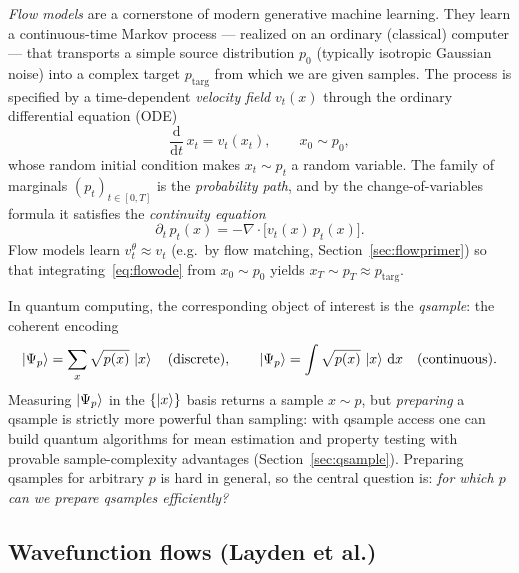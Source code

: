 \documentclass[11pt, a4paper]{article}
\begin{document}
\emph{Flow models} are a cornerstone of modern generative machine learning.
They learn a continuous-time Markov process --- realized on an ordinary
(classical) computer --- that transports a simple source distribution $p_0$
(typically isotropic Gaussian noise) into a complex target $p_{\mathrm{targ}}$
from which we are given samples. The process is specified by a time-dependent
\emph{velocity field} $v_t(x)$ through the ordinary differential equation (ODE)
\begin{equation}
  \frac{\mathrm{d}}{\mathrm{d}t}\,x_t=v_t(x_t),\qquad x_0\sim p_0,
  \label{eq:flowode}
\end{equation}
whose random initial condition makes $x_t\sim p_t$ a random variable. The
family of marginals $(p_t)_{t\in[0,T]}$ is the \emph{probability path}, and by
the change-of-variables formula it satisfies the \emph{continuity equation}
\begin{equation}
  \partial_t\,p_t(x)=-\nabla\!\cdot\bigl[v_t(x)\,p_t(x)\bigr].
  \label{eq:continuityeq}
\end{equation}
Flow models learn $v_t^\theta\approx v_t$ (e.g.\ by flow matching,
Section~\ref{sec:flowprimer}) so that integrating~\eqref{eq:flowode} from
$x_0\sim p_0$ yields $x_T\sim p_T\approx p_{\mathrm{targ}}$.

In quantum computing, the corresponding object of interest is the
\emph{qsample}: the coherent encoding
\begin{equation}
  \ket{\Psi_p}=\sum_x\sqrt{p(x)}\,\ket{x}
  \quad\text{(discrete)},\qquad
  \ket{\Psi_p}=\int\sqrt{p(x)}\,\ket{x}\,\mathrm{d}x
  \quad\text{(continuous)}.
\end{equation}
Measuring $\ket{\Psi_p}$ in the $\{\ket{x}\}$ basis returns a sample
$x\sim p$, but \emph{preparing} a qsample is strictly more powerful than
sampling: with qsample access one can build quantum algorithms for mean
estimation and property testing with provable sample-complexity advantages
(Section~\ref{sec:qsample}). Preparing qsamples for arbitrary $p$ is hard in
general, so the central question is: \emph{for which $p$ can we prepare
qsamples efficiently?}

\subsection{Wavefunction flows (Layden et al.)}
\end{document}

